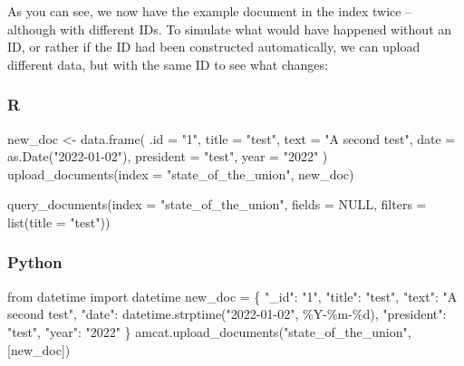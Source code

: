\documentclass[
  letterpaper,
  DIV=11,
  numbers=noendperiod]{scrreprt}
\newenvironment{Shaded}{\begin{snugshade}}{\end{snugshade}}
\newcommand{\AttributeTok}[1]{\textcolor[rgb]{0.40,0.45,0.13}{#1}}
\newcommand{\ConstantTok}[1]{\textcolor[rgb]{0.56,0.35,0.01}{#1}}
\newcommand{\FunctionTok}[1]{\textcolor[rgb]{0.28,0.35,0.67}{#1}}
\newcommand{\ImportTok}[1]{\textcolor[rgb]{0.00,0.46,0.62}{#1}}
\newcommand{\NormalTok}[1]{\textcolor[rgb]{0.00,0.23,0.31}{#1}}
\newcommand{\OperatorTok}[1]{\textcolor[rgb]{0.37,0.37,0.37}{#1}}
\newcommand{\OtherTok}[1]{\textcolor[rgb]{0.00,0.23,0.31}{#1}}
\newcommand{\SpecialCharTok}[1]{\textcolor[rgb]{0.37,0.37,0.37}{#1}}
\newcommand{\StringTok}[1]{\textcolor[rgb]{0.13,0.47,0.30}{#1}}
\begin{document}
As you can see, we now have the example document in the index twice --
although with different IDs. To simulate what would have happened
without an ID, or rather if the ID had been constructed automatically,
we can upload different data, but with the same ID to see what changes:

\subsubsection{R}

\begin{Shaded}
\begin{Highlighting}[]
\NormalTok{new\_doc }\OtherTok{\textless{}{-}} \FunctionTok{data.frame}\NormalTok{(}
  \AttributeTok{.id =} \StringTok{"1"}\NormalTok{,}
  \AttributeTok{title =} \StringTok{"test"}\NormalTok{,}
  \AttributeTok{text =} \StringTok{"A second test"}\NormalTok{,}
  \AttributeTok{date =} \FunctionTok{as.Date}\NormalTok{(}\StringTok{"2022{-}01{-}02"}\NormalTok{),}
  \AttributeTok{president =} \StringTok{"test"}\NormalTok{,}
  \AttributeTok{year =} \StringTok{"2022"}
\NormalTok{)}
\FunctionTok{upload\_documents}\NormalTok{(}\AttributeTok{index =} \StringTok{"state\_of\_the\_union"}\NormalTok{, new\_doc)}
\end{Highlighting}
\end{Shaded}

\begin{Shaded}
\begin{Highlighting}[]
\FunctionTok{query\_documents}\NormalTok{(}\AttributeTok{index =} \StringTok{"state\_of\_the\_union"}\NormalTok{, }\AttributeTok{fields =} \ConstantTok{NULL}\NormalTok{, }\AttributeTok{filters =} \FunctionTok{list}\NormalTok{(}\AttributeTok{title =} \StringTok{"test"}\NormalTok{))}
\end{Highlighting}
\end{Shaded}

\subsubsection{Python}

\begin{Shaded}
\begin{Highlighting}[]
\ImportTok{from}\NormalTok{ datetime }\ImportTok{import}\NormalTok{ datetime}
\NormalTok{new\_doc }\OperatorTok{=}\NormalTok{ \{}
  \StringTok{"\_id"}\NormalTok{: }\StringTok{"1"}\NormalTok{,}
  \StringTok{"title"}\NormalTok{: }\StringTok{"test"}\NormalTok{,}
  \StringTok{"text"}\NormalTok{: }\StringTok{"A second test"}\NormalTok{,}
  \StringTok{"date"}\NormalTok{: datetime.strptime(}\StringTok{"2022{-}01{-}02"}\NormalTok{, }\StringTok{\textquotesingle{}\%Y{-}\%m{-}}\SpecialCharTok{\%d}\StringTok{\textquotesingle{}}\NormalTok{),}
  \StringTok{"president"}\NormalTok{: }\StringTok{"test"}\NormalTok{,}
  \StringTok{"year"}\NormalTok{: }\StringTok{"2022"}
\NormalTok{\}}
\NormalTok{amcat.upload\_documents(}\StringTok{"state\_of\_the\_union"}\NormalTok{, [new\_doc])}
\end{Highlighting}
\end{Shaded}
\end{document}
